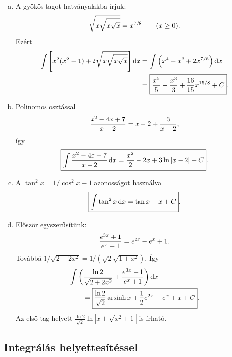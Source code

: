 \documentclass{szb-solution}
\begin{document}
\begin{enumerate}[a)]
  \item A gyökös tagot hatványalakba írjuk:
        $$
          \sqrt{x\sqrt{x\sqrt{x}}}=x^{7/8}
          \qquad(x\geq0)
          \text.
        $$
        Ezért
        \begin{align*}
          \int\left[x^2(x^2-1)
          +2\sqrt{x\sqrt{x\sqrt{x}}}\right]\mathop{}\!\mathrm{d} x
          &=\int\left(x^4-x^2+2x^{7/8}\right)\mathop{}\!\mathrm{d} x\\
          &=\boxed{\frac{x^5}{5}-\frac{x^3}{3}
          +\frac{16}{15}x^{15/8}+C}
          \text.
        \end{align*}

  \item Polinomos osztással
        $$
          \frac{x^2-4x+7}{x-2}=x-2+\frac3{x-2}
          \text,
        $$
        így
        $$
          \boxed{\int\frac{x^2-4x+7}{x-2}\mathop{}\!\mathrm{d} x
          =\frac{x^2}{2}-2x+3\ln|x-2|+C}
          \text.
        $$

  \item A $\tan^2x=1/\cos^2x-1$ azonosságot használva
        $$
          \boxed{\int\tan^2x\mathop{}\!\mathrm{d} x=\tan x-x+C}
          \text.
        $$

  \item Először egyszerűsítünk:
        $$
          \frac{e^{3x}+1}{e^x+1}=e^{2x}-e^x+1
          \text.
        $$
        Továbbá
        $1/\sqrt{2+2x^2}=1/(\sqrt2\sqrt{1+x^2})$. Így
        \begin{align*}
          &\int\left(
          \frac{\ln2}{\sqrt{2+2x^2}}
          +\frac{e^{3x}+1}{e^x+1}\right)\mathop{}\!\mathrm{d} x\\
          &\qquad=\boxed{
          \frac{\ln2}{\sqrt2}\operatorname{arsinh}x
          +\frac12e^{2x}-e^x+x+C}
          \text.
        \end{align*}
        Az első tag helyett
        $\frac{\ln2}{\sqrt2}\ln|x+\sqrt{x^2+1}|$ is írható.
\end{enumerate}

\subsection{Integrálás helyettesítéssel}
\end{document}
